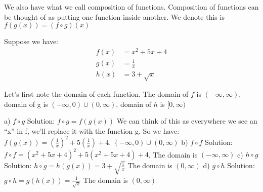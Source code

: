 \documentclass{ximera}
\begin{document}
We also have what we call composition of functions.  Composition of
functions can be thought of as putting one function inside another.
We denote this is $f(g(x))=(f\circ g)(x)$

\begin{example}
 Suppose we have:
\begin{align}
  f(x)&={{x}^{2}}+5x+4 \\ 
  g(x)&=\frac{1}{x} \\ 
  h(x)&=3+\sqrt{x}
\end{align}

Let’s first note the domain of each function.  The domain of $f$
is $(-\infty ,\infty )$, domain of g is $(-\infty ,0)\cup (0,\infty )$,
domain of $h$ is $[0,\infty )$
 
a)	$f\circ g$ 
Solution: $f\circ g=f(g(x))$ We can think of this as everywhere we see an “x” in f, we’ll replace it with the function g. So we have: $f(g(x))={{\left( \frac{1}{x} \right)}^{2}}+5\left( \frac{1}{x} \right)+4$.  $(-\infty ,0)\cup (0,\infty )$
b)	$f\circ f$ 
Solution: $f\circ f={{\left( {{x}^{2}}+5x+4 \right)}^{2}}+5\left( {{x}^{2}}+5x+4 \right)+4$.  The domain is $(-\infty ,\infty )$
c)	$h\circ g$  
Solution: $h\circ g=h(g(x))=3+\sqrt{\frac{1}{x}}$ The domain is $(0,\infty )$
d)	$g\circ h$ 
Solution:$g\circ h=g(h(x))=\frac{1}{\sqrt{x}}$ The domain is $(0,\infty )$
\end{example}
\end{document}
